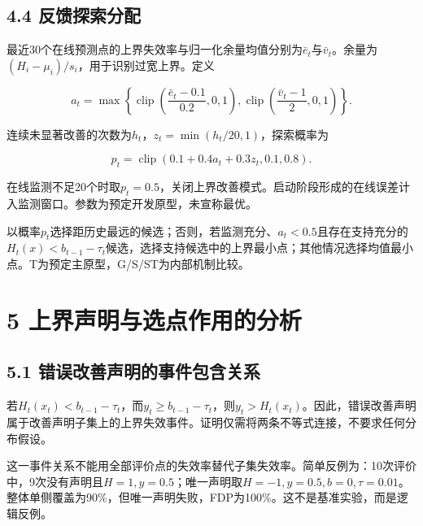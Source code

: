 \documentclass[11pt,a4paper]{article}
\begin{document}
\begin{samepage}

\hypertarget{ux53cdux9988ux63a2ux7d22ux5206ux914d}{%
\subsection{4.4
反馈探索分配}\label{ux53cdux9988ux63a2ux7d22ux5206ux914d}}

最近30个在线预测点的上界失效率与归一化余量均值分别为\(\bar e_t\)与\(\bar v_t\)。余量为\((H_i-\mu_i)/s_i\)，用于识别过宽上界。定义

\[
a_t=\max\left\{\operatorname{clip}\left(\frac{\bar e_t-0.1}{0.2},0,1\right),\operatorname{clip}\left(\frac{\bar v_t-1}{2},0,1\right)\right\}.
\]

\end{samepage}

连续未显著改善的次数为\(h_t\)，\(z_t=\min(h_t/20,1)\)，探索概率为

\[
p_t=\operatorname{clip}(0.1+0.4a_t+0.3z_t,0.1,0.8).
\]

在线监测不足20个时取\(p_t=0.5\)，关闭上界改善模式。启动阶段形成的在线误差计入监测窗口。参数为预定开发原型，未宣称最优。

以概率\(p_t\)选择距历史最远的候选；否则，若监测充分、\(a_t<0.5\)且存在支持充分的\(H_t(x)<b_{t-1}-\tau_t\)候选，选择支持候选中的上界最小点；其他情况选择均值最小点。T为预定主原型，G/S/ST为内部机制比较。

\hypertarget{ux4e0aux754cux58f0ux660eux4e0eux9009ux70b9ux4f5cux7528ux7684ux5206ux6790}{%
\section{5
上界声明与选点作用的分析}\label{ux4e0aux754cux58f0ux660eux4e0eux9009ux70b9ux4f5cux7528ux7684ux5206ux6790}}

\hypertarget{ux9519ux8befux6539ux5584ux58f0ux660eux7684ux4e8bux4ef6ux5305ux542bux5173ux7cfb}{%
\subsection{5.1
错误改善声明的事件包含关系}\label{ux9519ux8befux6539ux5584ux58f0ux660eux7684ux4e8bux4ef6ux5305ux542bux5173ux7cfb}}

若\(H_t(x_t)<b_{t-1}-\tau_t\)，而\(y_t\ge b_{t-1}-\tau_t\)，则\(y_t>H_t(x_t)\)。因此，错误改善声明属于改善声明子集上的上界失效事件。证明仅需将两条不等式连接，不要求任何分布假设。

这一事件关系不能用全部评价点的失效率替代子集失效率。简单反例为：10次评价中，9次没有声明且\(H=1,y=0.5\)；唯一声明取\(H=-1,y=0.5,b=0,\tau=0.01\)。整体单侧覆盖为90\%，但唯一声明失败，FDP为100\%。这不是基准实验，而是逻辑反例。
\end{document}

